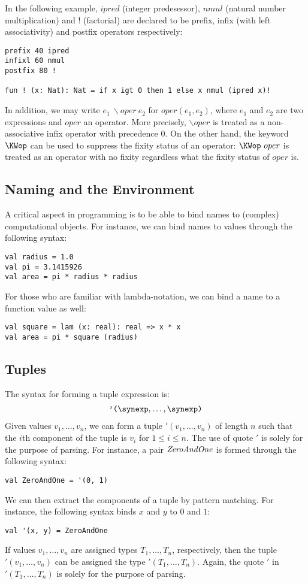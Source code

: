 In the following example, $ipred$ (integer predesessor), $nmul$ (natural
number multiplication) and $!$ (factorial) are declared to be prefix, infix
(with left associativity) and postfix operators respectively:
\begin{verbatim}
prefix 40 ipred
infixl 60 nmul
postfix 80 !

fun ! (x: Nat): Nat = if x igt 0 then 1 else x nmul (ipred x)!
\end{verbatim}
In addition, we may write $e_1~\backslash oper~e_2$ for $oper(e_1, e_2)$,
where $e_1$ and $e_2$ are two expressions and $oper$ an operator. More
precisely, $\backslash oper$ is treated as a non-associative infix operator
with precedence $0$.  On the other hand, the keyword $\KWop$ can be used to
suppress the fixity status of an operator: $\KWop~oper$ is treated as an
operator with no fixity regardless what the fixity status of $oper$ is.

\subsection{Naming and the Environment}
A critical aspect in programming is to be able to bind names to (complex)
computational objects. For instance, we can bind names to values through
the following syntax:
\begin{verbatim}
val radius = 1.0
val pi = 3.1415926
val area = pi * radius * radius
\end{verbatim}
For those who are familiar with lambda-notation, we can bind a name to a
function value as well:
\begin{verbatim}
val square = lam (x: real): real => x * x
val area = pi * square (radius)
\end{verbatim}

\subsection{Tuples}
The syntax for forming a tuple expression is:
\[\begin{array}{c}
\texttt{'(}\synexp, \ldots, \synexp\texttt{)}
\end{array}\]
Given values $v_1,\ldots, v_n$, we can form a tuple $'(v_1,\ldots,v_n)$ of
length $n$ such that the $i$th component of the tuple is $v_i$ for $1\leq
i\leq n$. The use of quote $'$ is solely for the purpose of parsing. For
instance, a pair $\mbox{\it ZeroAndOne}$ is formed through the following
syntax:
\begin{verbatim}
val ZeroAndOne = '(0, 1)
\end{verbatim}
We can then extract the components of a tuple by pattern matching. For
instance, the following syntax binds $x$ and $y$ to $0$ and $1$:
\begin{verbatim}
val '(x, y) = ZeroAndOne
\end{verbatim}
If values $v_1,\ldots,v_n$ are assigned types $T_1,\ldots,T_n$,
respectively, then the tuple $'(v_1,\ldots,v_n)$ can be assigned the type
$'(T_1,\ldots,T_n)$. Again, the quote $'$ in $'(T_1,\ldots,T_n)$ is solely
for the purpose of parsing.

